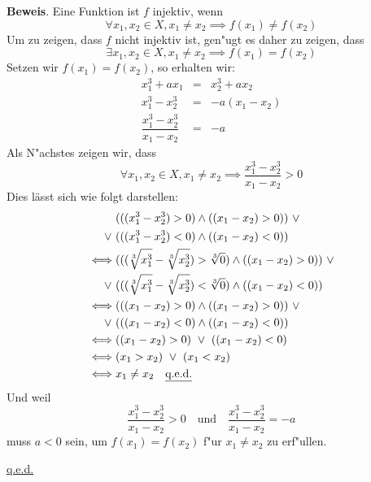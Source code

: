 \documentclass[10pt, oneside]{article}
\begin{document}
\begin{enumerate}[(a)]
        \textbf{Beweis}. Eine Funktion ist $f$ injektiv, wenn
        \begin{equation*}
            \forall x_1, x_2 \in X, x_1 \neq x_2 \implies f(x_1) \neq f(x_2)
        \end{equation*}
        Um zu zeigen, dass $f$ nicht injektiv ist, gen"ugt es daher zu zeigen,
        dass
        \begin{equation*}
            \exists x_1, x_2 \in X, x_1 \neq x_2 \implies f(x_1) = f(x_2)
        \end{equation*}
        Setzen wir $f(x_1) = f(x_2)$, so erhalten wir:
        \begin{equation*}
            \begin{array}{rcl}
                x_1^3 + ax_1 &=& x_2^3 + ax_2 \\[5pt]
                x_1^3 - x_2^3 &=& -a(x_1 - x_2)  \\[10pt]
                \dfrac{x_1^3 - x_2^3}{x_1 - x_2} &=& -a
            \end{array}
        \end{equation*}
        Als N"achstes zeigen wir, dass
        \begin{equation*}
            \forall x_1,x_2 \in X, x_1 \neq x_2 \implies \dfrac{x_1^3 - x_2^3}{x_1 - x_2} > 0
        \end{equation*}
        Dies lässt sich wie folgt darstellen:
        \begin{equation*}
            \begin{aligned}
                      &(((x_1^3 - x_2^3) > 0) \land ((x_1 - x_2) > 0))\  \lor \\
                \lor\ &(((x_1^3 - x_2^3) < 0) \land ((x_1 - x_2) < 0)) \\
                \iff  &(((\sqrt[3]{x_1^3} - \sqrt[3]{x_2^3}) > \sqrt[3]{0}) \land ((x_1 - x_2) > 0))\ \lor \\
                \lor\ &(((\sqrt[3]{x_1^3} - \sqrt[3]{x_2^3}) < \sqrt[3]{0}) \land ((x_1 - x_2) < 0)) \\
                \iff  &(((x_1 - x_2) > 0) \land ((x_1 - x_2) > 0))\ \lor \\
                \lor\ &(((x_1 - x_2) < 0) \land ((x_1 - x_2) < 0)) \\
                \iff  &((x_1 - x_2) > 0)\ \lor\ ((x_1 - x_2) < 0) \\
                \iff  &(x_1 > x_2)\ \lor\ (x_1 < x_2) \\
                \iff  &x_1 \neq x_2 \quad \text{\underline{q.e.d.}}
            \end{aligned}
        \end{equation*}
        Und weil
        \begin{equation*}
            \dfrac{x_1^3 - x_2^3}{x_1 - x_2} > 0 \quad\text{und}\quad \dfrac{x_1^3 - x_2^3}{x_1 - x_2} = -a
        \end{equation*}
        muss $a < 0$ sein, um $f(x_1) = f(x_2)$ f"ur $x_1 \neq x_2$ zu erf"ullen.
        \begin{center}
            \underline{q.e.d.}
        \end{center}
\end{enumerate}
\end{document}
